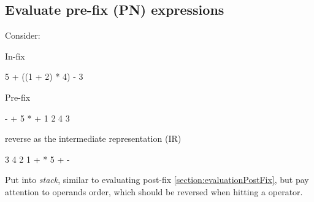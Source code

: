 \subsection{Evaluate pre-fix (PN) expressions}
Consider: 

In-fix
\begin{python}
5 + ((1 + 2) * 4) - 3
\end{python}

Pre-fix
\begin{python}
- + 5 * + 1 2 4 3
\end{python}

reverse as the intermediate representation (IR)
\begin{python}
3 4 2 1 + * 5 + -
\end{python}
Put into \textit{stack}, similar to evaluating post-fix \ref{section:evaluationPostFix}, but pay attention to operands order, which should be reversed when hitting a operator. 
